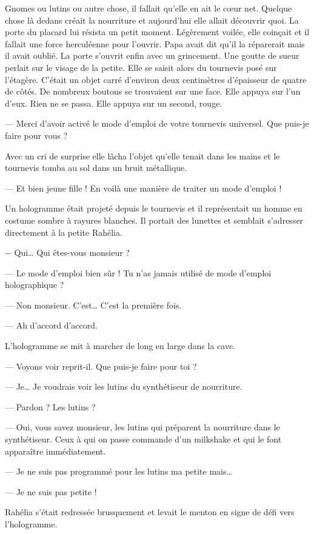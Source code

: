 Gnomes ou lutins ou autre chose, il fallait qu'elle en ait le cœur net. Quelque
chose là dedans créait la nourriture et aujourd'hui elle allait découvrir quoi.
La porte du placard lui résista un petit moment. Légèrement voilée, elle
coinçait et il fallait une force herculéenne pour l'ouvrir. Papa avait dit qu'il
la réparerait mais il avait oublié. La porte s'ouvrit enfin avec un grincement.
Une goutte de sueur perlait sur le visage de la petite. Elle se saisit alors du
tournevis posé sur l'étagère. C'était un objet carré d'environ deux centimètres
d'épaisseur de quatre de côtés. De nombreux boutons se trouvaient sur une face.
Elle appuya sur l'un d'eux. Rien ne se passa. Elle appuya sur un second, rouge.

— Merci d'avoir activé le mode d'emploi de votre tournevis universel. Que
puis-je faire pour vous ?

Avec un cri de surprise elle lâcha l'objet qu'elle tenait dans les mains et le
tournevis tomba au sol dans un bruit métallique.

  — Et bien jeune fille ! En voilà une manière de traiter un mode d'emploi !

Un hologramme était projeté depuis le tournevis et il représentait un homme en
costume sombre à rayures blanches. Il portait des lunettes et semblait
s'adresser directement à la petite Rahélia.

  − Qui… Qui êtes-vous monsieur ?

— Le mode d'emploi bien sûr ! Tu n'as jamais utilisé de mode d'emploi
holographique ?

  — Non monsieur. C'est… C'est la première fois.

  — Ah d'accord d'accord.

L'hologramme se mit à marcher de long en large dans la cave.

  — Voyons voir reprit-il. Que puis-je faire pour toi ?

  — Je… Je voudrais voir les lutins du synthétiseur de nourriture.

  — Pardon ? Les lutins ?

— Oui, vous savez monsieur, les lutins qui préparent la nourriture dans le
synthétiseur. Ceux à qui on passe commande d'un milkshake et qui le font
apparaître immédiatement.

  — Je ne suis pas programmé pour les lutins ma petite mais…

  — Je ne suis pas petite !

Rahélia s'était redressée brusquement et levait le menton en signe de défi vers
l'hologramme.

